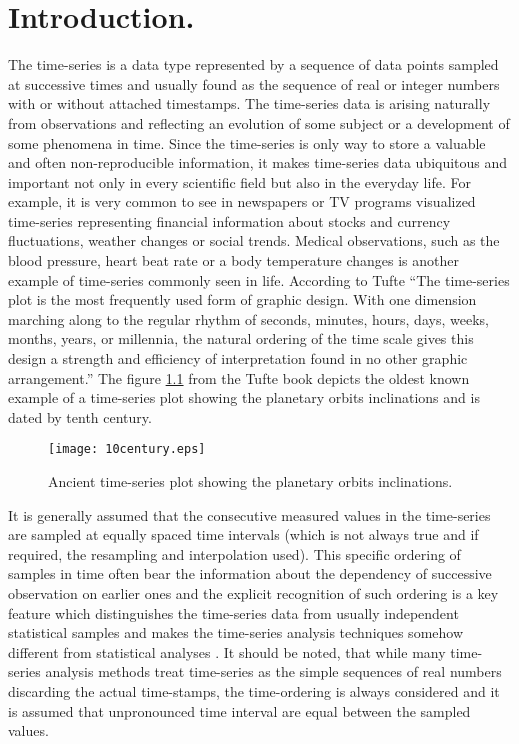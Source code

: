 \chapter{Introduction.}
The time-series is a data type represented by a sequence of data points sampled at successive times and usually found as the sequence of real or integer numbers with or without attached timestamps. The time-series data is arising naturally from observations and reflecting an evolution of some subject or a development of some phenomena in time. Since the time-series is only way to store a valuable and often non-reproducible information, it makes time-series data ubiquitous and important not only in every scientific field but also in the everyday life. For example, it is very common to see in newspapers or TV programs visualized time-series representing financial information about stocks and currency fluctuations, weather changes or social trends. Medical observations, such as the blood pressure, heart beat rate or a body temperature changes is another example of time-series commonly seen in life. According to Tufte \cite{citeulike:1454223} ``The time-series plot is the most frequently used form of graphic design. With one dimension marching along to the regular rhythm of seconds, minutes, hours, days, weeks, months, years, or millennia, the natural ordering of the time scale gives this design a strength and efficiency of interpretation found in no other graphic arrangement.'' The figure \ref{fig:10century} from the Tufte book depicts the oldest known example of a time-series plot showing the planetary orbits inclinations and is dated by tenth century.
\begin{figure}[tbp]
   \centering
   \texttt{[image: 10century.eps]}
   \caption{Ancient time-series plot showing the planetary orbits inclinations.}
   \label{fig:10century}
\end{figure} 

It is generally assumed that the consecutive measured values in the time-series are sampled at equally spaced time intervals (which is not always true and if required, the resampling and interpolation used). This specific ordering of samples in time often bear the information about the dependency of successive observation on earlier ones and the explicit recognition of such ordering is a key feature which distinguishes the time-series data from usually independent statistical samples and makes the time-series analysis techniques somehow different from statistical analyses \cite{citeulike:3989988}. It should be noted, that while many time-series analysis methods treat time-series as the simple sequences of real numbers discarding the actual time-stamps, the time-ordering is always considered and it is assumed that unpronounced time interval are equal between the sampled values.

